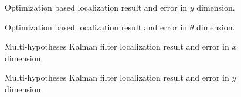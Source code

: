 \begin{figure}[!htbp]
  \centering
    \begin{subfigure}[b]{0.9\textwidth}
      
    \end{subfigure}
    \begin{subfigure}[b]{0.9\textwidth}
      
    \end{subfigure}
  \caption{Optimization based localization result and error in $y$ dimension.}
 \label{fig:benchmarkRprop1}
\end{figure}

\begin{figure}[!htbp]
  \centering
    \begin{subfigure}[b]{0.9\textwidth}
      
    \end{subfigure}
    \begin{subfigure}[b]{0.9\textwidth}
      
    \end{subfigure}
  \caption{Optimization based localization result and error in $\theta$ dimension.}
 \label{fig:benchmarkRprop2}
\end{figure}

\begin{figure}[!htbp]
  \centering
    \begin{subfigure}[b]{0.9\textwidth}
      
    \end{subfigure}
    \begin{subfigure}[b]{0.9\textwidth}
      
    \end{subfigure}
  \caption{Multi-hypotheses Kalman filter localization result and error  in $x$ dimension.}
 \label{fig:benchmarkKalman0}
\end{figure}

\begin{figure}[!htbp]
  \centering
    \begin{subfigure}[b]{0.9\textwidth}
      
    \end{subfigure}
    \begin{subfigure}[b]{0.9\textwidth}
      
    \end{subfigure}
  \caption{Multi-hypotheses Kalman filter localization result and error in $y$ dimension.}
 \label{fig:benchmarkKalman1}
\end{figure}

